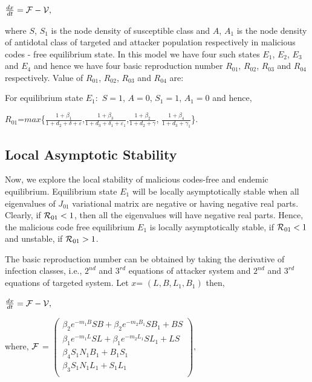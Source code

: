 \documentclass[conference]{IEEEtran}
\begin{document}
\indent $\frac{dx}{dt} = \cal{F}-\cal{V},$

\noindent where $S$, $S_1$ is the node density of susceptible class and $A$, $A_1$ is the node density of antidotal class of targeted and attacker population respectively in malicious codes - free equilibrium state. In this model we have four such states $E_1$, $E_2$, $E_3$ and $E_4$ and hence we have four basic reproduction number $R_{01}$, $R_{02}$, $R_{03}$ and $R_{04}$ respectively.
Value of $R_{01}$, $R_{02}$, $R_{03}$ and $R_{04}$ are:

\noindent For equilibrium state $E_1:$ $S=1$, $A=0$, $S_1=1$, $A_1=0$ and hence,

$R_{01}$=$max$\{$\frac{1+{\beta}_1}{1+d_2+\delta+\varepsilon}$,$\frac{1+{\beta}_3}{1+d_3+{\delta}_1+{\varepsilon}_1}$,$\frac{1+{\beta}_2}{1+d_2+\gamma}$,
$\frac{1+{\beta}_4}{1+d_3+{\gamma}_1}$\}.

\subsection{Local Asymptotic Stability}
Now, we explore the local stability of malicious codes-free and endemic equilibrium. Equilibrium state $E_1$ will be locally asymptotically stable when all  eigenvalues of $J_ {01}$ variational matrix are negative or having negative real parts.
Clearly, if ${{\cal R}}_{01}<1$, then all the eigenvalues will have negative real parts. Hence, the malicious code free equilibrium $E_1$ is locally asymptotically stable, if ${\cal R}_{01} < 1$ and unstable, if ${\cal R}_{01} > 1$.

The basic reproduction number can be obtained by taking the derivative of infection classes, i.e., $2^{nd}$ and $3^{rd}$ equations of attacker system and $2^{nd}$ and $3^{rd}$ equations of targeted system. Let $x$= $(L, B, L_{1}, B_{1})$ then,

$\frac{dx}{dt} = \cal{F}-\cal{V},$

\noindent where,
\begingroup
\everymath{\scriptstyle}
\scriptsize
$\cal{F}$ =
    ${\left(
    \begin{array}{c}
      {\beta}_2 e^{-m_1 B} S B+{\beta}_2 e^{-m_2 B_1} S B_1+B S \\
      {\beta}_1 e^{-m_1 L} S L+{\beta}_1 e^{-m_2 L_1} S L_1+L S  \\
      {\beta}_4 S_1 N_1 B_1+B_1 S_1 \\
      {\beta}_3 S_1 N_1 L_1+S_1 L_1 \\
    \end{array}
  \right) },$
\endgroup
\end{document}
